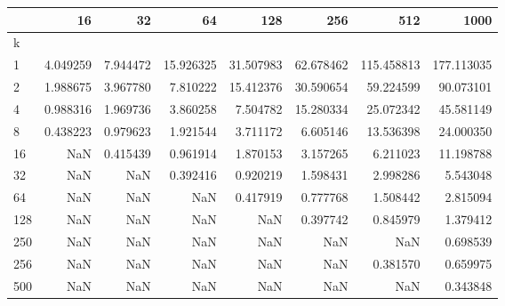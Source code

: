 \begin{tabular}{lrrrrrrr}
\toprule
{} &      16   &      32   &       64   &       128  &       256  &        512  &        1000 \\
\midrule
k   &           &           &            &            &            &             &             \\
1   &  4.049259 &  7.944472 &  15.926325 &  31.507983 &  62.678462 &  115.458813 &  177.113035 \\
2   &  1.988675 &  3.967780 &   7.810222 &  15.412376 &  30.590654 &   59.224599 &   90.073101 \\
4   &  0.988316 &  1.969736 &   3.860258 &   7.504782 &  15.280334 &   25.072342 &   45.581149 \\
8   &  0.438223 &  0.979623 &   1.921544 &   3.711172 &   6.605146 &   13.536398 &   24.000350 \\
16  &       NaN &  0.415439 &   0.961914 &   1.870153 &   3.157265 &    6.211023 &   11.198788 \\
32  &       NaN &       NaN &   0.392416 &   0.920219 &   1.598431 &    2.998286 &    5.543048 \\
64  &       NaN &       NaN &        NaN &   0.417919 &   0.777768 &    1.508442 &    2.815094 \\
128 &       NaN &       NaN &        NaN &        NaN &   0.397742 &    0.845979 &    1.379412 \\
250 &       NaN &       NaN &        NaN &        NaN &        NaN &         NaN &    0.698539 \\
256 &       NaN &       NaN &        NaN &        NaN &        NaN &    0.381570 &    0.659975 \\
500 &       NaN &       NaN &        NaN &        NaN &        NaN &         NaN &    0.343848 \\
\bottomrule
\end{tabular}

